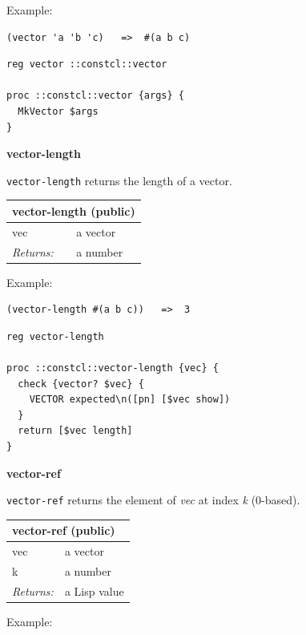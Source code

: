 \documentclass[twoside,9pt]{report}
\begin{document}
Example:

\noindent\makebox[\linewidth]{\rule{\linewidth}{0.4pt}}
\begin{lstlisting}
(vector 'a 'b 'c)   =>  #(a b c)
\end{lstlisting}
\noindent\makebox[\linewidth]{\rule{\linewidth}{0.4pt}}
\noindent\makebox[\linewidth]{\rule{\linewidth}{0.4pt}}
\begin{lstlisting}
reg vector ::constcl::vector
 
proc ::constcl::vector {args} {
  MkVector $args
}
\end{lstlisting}
\noindent\makebox[\linewidth]{\rule{\linewidth}{0.4pt}}

\textbf{vector-length}


\texttt{vector-length} returns the length of a vector.

\begin{tabular}{ |l l| }
\hline
\multicolumn{2}{|l|}{vector-length (public)} \\
\hline
vec & a vector \\
\textit{Returns:} & a number \\
\hline
\end{tabular}


Example:

\noindent\makebox[\linewidth]{\rule{\linewidth}{0.4pt}}
\begin{lstlisting}
(vector-length #(a b c))   =>  3
\end{lstlisting}
\noindent\makebox[\linewidth]{\rule{\linewidth}{0.4pt}}
\noindent\makebox[\linewidth]{\rule{\linewidth}{0.4pt}}
\begin{lstlisting}
reg vector-length
 
proc ::constcl::vector-length {vec} {
  check {vector? $vec} {
    VECTOR expected\n([pn] [$vec show])
  }
  return [$vec length]
}
\end{lstlisting}
\noindent\makebox[\linewidth]{\rule{\linewidth}{0.4pt}}

\textbf{vector-ref}


\texttt{vector-ref} returns the element of \emph{vec} at index \emph{k} (0-based).

\begin{tabular}{ |l l| }
\hline
\multicolumn{2}{|l|}{vector-ref (public)} \\
\hline
vec & a vector \\
k & a number \\
\textit{Returns:} & a Lisp value \\
\hline
\end{tabular}


Example:
\end{document}

